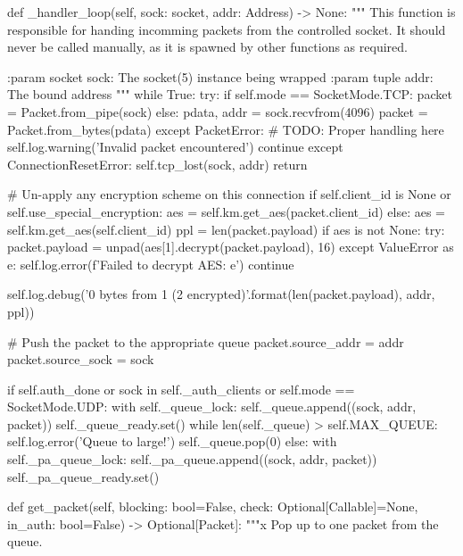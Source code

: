 \begin{pythoncode}
    def _handler_loop(self, sock: socket, addr: Address) -> None:
        """
        This function is responsible for handing incomming packets from the
        controlled socket. It should never be called manually, as it is spawned
        by other functions as required.

        :param socket sock: The socket(5) instance being wrapped
        :param tuple addr: The bound address
        """
        while True:
            try:
                if self.mode == SocketMode.TCP:
                    packet = Packet.from_pipe(sock)
                else:
                    pdata, addr = sock.recvfrom(4096)
                    packet = Packet.from_bytes(pdata)
            except PacketError:
                # TODO: Proper handling here
                self.log.warning('Invalid packet encountered')
                continue
            except ConnectionResetError:
                self.tcp_lost(sock, addr)
                return

            # Un-apply any encryption scheme on this connection
            if self.client_id is None or self.use_special_encryption:
                aes = self.km.get_aes(packet.client_id)
            else:
                aes = self.km.get_aes(self.client_id)
            ppl = len(packet.payload)
            if aes is not None:
                try:
                    packet.payload = unpad(aes[1].decrypt(packet.payload), 16)
                except ValueError as e:
                    self.log.error(f'Failed to decrypt AES: {e}')
                    continue

            self.log.debug('{0} bytes from {1} ({2} encrypted)'.format(len(packet.payload), addr, ppl))

            # Push the packet to the appropriate queue
            packet.source_addr = addr
            packet.source_sock = sock

            if self.auth_done or sock in self._auth_clients or self.mode == SocketMode.UDP:
                with self._queue_lock:
                    self._queue.append((sock, addr, packet))
                    self._queue_ready.set()
                    while len(self._queue) > self.MAX_QUEUE:
                        self.log.error('Queue to large!')
                        self._queue.pop(0)
            else:
                with self._pa_queue_lock:
                    self._pa_queue.append((sock, addr, packet))
                    self._pa_queue_ready.set()

    def get_packet(self, blocking: bool=False, check: Optional[Callable]=None,
                  in_auth: bool=False) -> Optional[Packet]:
        """x
        Pop up to one packet from the queue.


\end{pythoncode}
